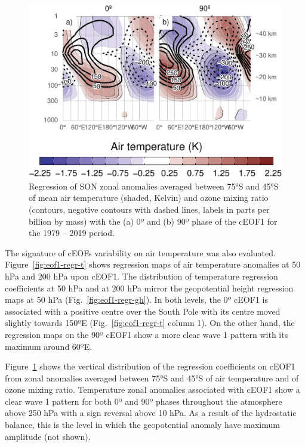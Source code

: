 \documentclass[pdflatex,sn-basic]{sn-jnl}
\theoremstyle{thmstyleone}%
\theoremstyle{thmstyletwo}%
\theoremstyle{thmstylethree}%
\begin{document}
\begin{figure}
\centering
\includegraphics{../figures/t-vertical-1.pdf}
\caption{\label{fig:t-vertical}Regression of SON zonal anomalies averaged between 75°S and 45°S of mean air temperature (shaded, Kelvin) and ozone mixing ratio (contours, negative contours with dashed lines, labels in parts per billion by mass) with the (a) 0º and (b) 90º phase of the cEOF1 for the 1979 -- 2019 period.}
\end{figure}

The signature of cEOFs variability on air temperature was also evaluated.
Figure~\ref{fig:eof1-regr-t} shows regression maps of air temperature anomalies at 50 hPa and 200 hPa upon cEOF1.
The distribution of temperature regression coefficients at 50 hPa and at 200 hPa mirror the geopotential height regression maps at 50 hPa (Fig.~\ref{fig:eof1-regr-gh}).
In both levels, the 0º cEOF1 is associated with a positive centre over the South Pole with its centre moved slightly towards 150ºE (Fig.~\ref{fig:eof1-regr-t} column 1).
On the other hand, the regression maps on the 90º cEOF1 show a more clear wave 1 pattern with its maximum around 60ºE.

Figure~\ref{fig:t-vertical} shows the vertical distribution of the regression coefficients on cEOF1 from zonal anomalies averaged between 75°S and 45°S of air temperature and of ozone mixing ratio.
Temperature zonal anomalies associated with cEOF1 show a clear wave 1 pattern for both 0º and 90º phases throughout the atmosphere above 250 hPa with a sign reversal above 10 hPa.
As a result of the hydrostatic balance, this is the level in which the geopotential anomaly have maximum amplitude (not shown).
\end{document}
